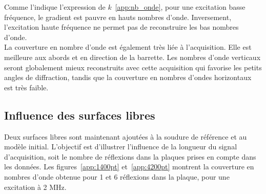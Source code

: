 Comme l'indique l'expression de $k$~\ref{app:nb_onde}, pour une excitation basse fréquence, le gradient est pauvre en hauts nombres d'onde. Inversement, l'excitation haute fréquence ne permet pas de reconstruire les bas nombres d'onde.\\
La couverture en nombre d'onde est également très liée à l'acquisition. Elle est meilleure aux abords et en direction de la barrette. Les nombres d'onde verticaux seront globalement mieux reconstruits avec cette acquisition qui favorise les petits angles de diffraction, tandis que la couverture en nombres d'ondes horizontaux est très faible.

\subsection{Influence des surfaces libres}

Deux surfaces libres sont maintenant ajoutées à la soudure de référence et au modèle initial. L'objectif est d'illustrer l'influence de la longueur du signal d'acquisition, soit le nombre de réflexions dans la plaques prises en compte dans les données. Les figures~\ref{app:1400pt} et~\ref{app:4200pt} montrent la couverture en nombres d'onde obtenue  pour 1 et 6 réflexions dans la plaque, pour une excitation à 2 MHz.

